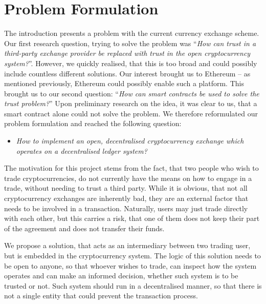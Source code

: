 \section{Problem Formulation}\label{sec:problem-formulation}
% 
The introduction presents a problem with the current currency exchange scheme. Our first research question, trying to solve the problem was ``\textit{How can trust in a third-party exchange provider be replaced with trust in the open cryptocurrency system?}''. However, we quickly realised, that this is too broad and could possibly include countless different solutions. Our interest brought us to Ethereum -- as mentioned previously, Ethereum could possibly enable such a platform. This brought us to our second question: ``\textit{How can smart contracts be used to solve the trust problem?}'' Upon preliminary research on the idea, it was clear to us, that a smart contract alone could not solve the problem. We therefore reformulated our problem formulation and reached the following question:

\begin{itemize}
    \item \textit{How to implement an open, decentralised cryptocurrency exchange which operates on a decentralised ledger system?}
\end{itemize}

\noindent The motivation for this project stems from the fact, that two people who wish to trade cryptocurrencies, do not currently have the means on how to engage in a trade, without needing to trust a third party. While it is obvious, that not all cryptocurrency exchanges are inherently bad, they are an external factor that needs to be involved in a transaction. Naturally, users may just trade directly with each other, but this carries a risk, that one of them does not keep their part of the agreement and does not transfer their funds.

We propose a solution, that acts as an intermediary between two trading user, but is embedded in the cryptocurrency system. The logic of this solution needs to be open to anyone, so that whoever wishes to trade, can inspect how the system operates and can make an informed decision, whether such system is to be trusted or not. Such system should run in a decentralised manner, so that there is not a single entity that could prevent the transaction process.